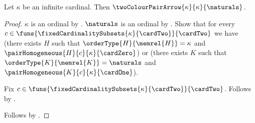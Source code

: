 \begin{theorem}\label{erdos_dushnik_miller_pair_arrow}
    Let $\kappa$ be an infinite cardinal.
    Then $\twoColourPairArrow{\kappa}{\kappa}{\naturals}$.
\end{theorem}
\begin{proof}
    $\kappa$ is an ordinal by .
    $\naturals$ is an ordinal by .
    Show that for every
        $c\in\funs{\fixedCardinalitySubsets{\kappa}{\cardTwo}}
            {\cardTwo}$ we have
        (there exists $H$ such that
            $\orderType{H}{\memrel{H}}=\kappa$ and
            $\pairHomogeneous{H}{c}{\kappa}{\cardZero}$) or
        (there exists $K$ such that
            $\orderType{K}{\memrel{K}}=\naturals$ and
            $\pairHomogeneous{K}{c}{\kappa}{\cardOne}$).
    \begin{subproof}
        Fix $c\in\funs{\fixedCardinalitySubsets{\kappa}{\cardTwo}}
            {\cardTwo}$.
        Follows by .
    \end{subproof}
    Follows by .
\end{proof}
